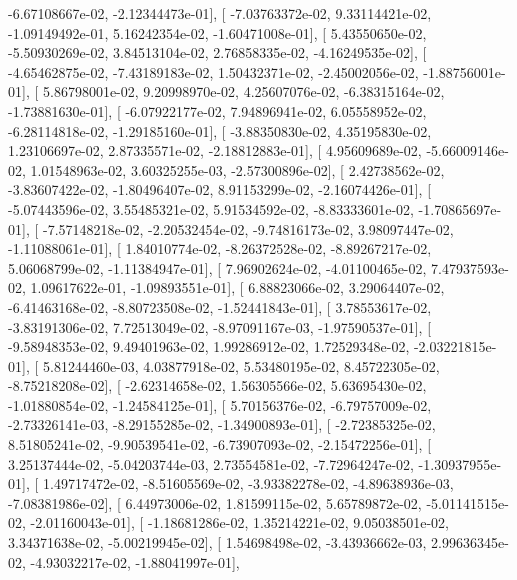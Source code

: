\documentclass{article}
\begin{document}
         -6.67108667e-02,  -2.12344473e-01],
       [ -7.03763372e-02,   9.33114421e-02,  -1.09149492e-01,
          5.16242354e-02,  -1.60471008e-01],
       [  5.43550650e-02,  -5.50930269e-02,   3.84513104e-02,
          2.76858335e-02,  -4.16249535e-02],
       [ -4.65462875e-02,  -7.43189183e-02,   1.50432371e-02,
         -2.45002056e-02,  -1.88756001e-01],
       [  5.86798001e-02,   9.20998970e-02,   4.25607076e-02,
         -6.38315164e-02,  -1.73881630e-01],
       [ -6.07922177e-02,   7.94896941e-02,   6.05558952e-02,
         -6.28114818e-02,  -1.29185160e-01],
       [ -3.88350830e-02,   4.35195830e-02,   1.23106697e-02,
          2.87335571e-02,  -2.18812883e-01],
       [  4.95609689e-02,  -5.66009146e-02,   1.01548963e-02,
          3.60325255e-03,  -2.57300896e-02],
       [  2.42738562e-02,  -3.83607422e-02,  -1.80496407e-02,
          8.91153299e-02,  -2.16074426e-01],
       [ -5.07443596e-02,   3.55485321e-02,   5.91534592e-02,
         -8.83333601e-02,  -1.70865697e-01],
       [ -7.57148218e-02,  -2.20532454e-02,  -9.74816173e-02,
          3.98097447e-02,  -1.11088061e-01],
       [  1.84010774e-02,  -8.26372528e-02,  -8.89267217e-02,
          5.06068799e-02,  -1.11384947e-01],
       [  7.96902624e-02,  -4.01100465e-02,   7.47937593e-02,
          1.09617622e-01,  -1.09893551e-01],
       [  6.88823066e-02,   3.29064407e-02,  -6.41463168e-02,
         -8.80723508e-02,  -1.52441843e-01],
       [  3.78553617e-02,  -3.83191306e-02,   7.72513049e-02,
         -8.97091167e-03,  -1.97590537e-01],
       [ -9.58948353e-02,   9.49401963e-02,   1.99286912e-02,
          1.72529348e-02,  -2.03221815e-01],
       [  5.81244460e-03,   4.03877918e-02,   5.53480195e-02,
          8.45722305e-02,  -8.75218208e-02],
       [ -2.62314658e-02,   1.56305566e-02,   5.63695430e-02,
         -1.01880854e-02,  -1.24584125e-01],
       [  5.70156376e-02,  -6.79757009e-02,  -2.73326141e-03,
         -8.29155285e-02,  -1.34900893e-01],
       [ -2.72385325e-02,   8.51805241e-02,  -9.90539541e-02,
         -6.73907093e-02,  -2.15472256e-01],
       [  3.25137444e-02,  -5.04203744e-03,   2.73554581e-02,
         -7.72964247e-02,  -1.30937955e-01],
       [  1.49717472e-02,  -8.51605569e-02,  -3.93382278e-02,
         -4.89638936e-03,  -7.08381986e-02],
       [  6.44973006e-02,   1.81599115e-02,   5.65789872e-02,
         -5.01141515e-02,  -2.01160043e-01],
       [ -1.18681286e-02,   1.35214221e-02,   9.05038501e-02,
          3.34371638e-02,  -5.00219945e-02],
       [  1.54698498e-02,  -3.43936662e-03,   2.99636345e-02,
         -4.93032217e-02,  -1.88041997e-01],
\end{document}
